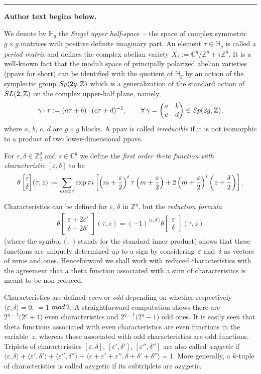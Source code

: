 \documentclass[11pt]{article}
\numberwithin{equation}{section}
\numberwithin{equation}{section}
\newcommand{\de}{\delta}
\newcommand{\ep}{\varepsilon}
\newcommand{\CC}{{\mathbb{C}}}
\newcommand{\HH}{{\mathbb{H}}}
\newcommand{\ZZ}{{\mathbb{Z}}}
\def\ZZ{{\mathbb Z}}
\def\t{\theta}
\def\tt#1#2{{\t\left[\begin{matrix}{#1}\\ {#2}\end{matrix}\right]}}
\begin{document}
\medskip\hrule\medskip\noindent\textbf{Author text begins below.}\par
\setcounter{section}{1}
We denote by $\HH_g$ the {\it Siegel upper half-space}~-- the
space of complex symmetric $g\times g$ matrices with positive definite
imaginary part. An element $\tau\in\HH_g$ is called a {\it period
matrix} and defines the complex abelian variety $X_\tau:=\CC^g/\ZZ^g+\tau
\ZZ^g$. It is a well-known fact that the moduli space of principally polarized abelian varieties (ppavs for short) can be identified with the quotient of $\HH_g$ by an action of the symplectic group ${\rm Sp}(2g, \ZZ)$ which is a generalization of the standard action of ${\rm SL}(2,\ZZ)$ on the complex upper-half plane, namely,
\[
\gamma \cdot \tau := (a \tau + b) \cdot (c \tau + d)^{-1},\qquad \forall\, \gamma = \begin{pmatrix} a & b \\ c & d \end{pmatrix} \in {\rm Sp}(2g,\ZZ),
\]
where $a$, $b$, $c$, $d$ are $g \times g$ blocks. A ppav is called {\it irreducible} if it is not isomorphic to a product of two lower-dimensional ppavs.

For $\ep,\de\in \ZZ_2^g$ and $z\in \CC^g$ we define the {\it first order theta function with characteristic $[\ep,\de]$} to be
\[
\tt\ep\de(\tau,z):=\sum\limits_{m\in\ZZ^g} \exp \pi {\rm i} \left[\left(
m+\frac{\ep}{2}\right)^t\tau \left(m+\frac{\ep}{2}\right)+2\left(m+\frac{\ep}{2}\right)^t\left(z+
\frac{\de}{2}\right)\right].
\]

Characteristics can be defined for $\ep$, $\de$ in $\ZZ^g$, but the {\it reduction formula}
\begin{gather*}%
\tt{\ep+2\ep'}{\de+2\de'} (\tau , z) = (-1)^{\langle \ep ,\de'\rangle} \tt\ep\de(\tau,z) \end{gather*}
(where the symbol $\langle \cdot , \cdot \rangle$ stands for the standard inner product) shows that these functions are uniquely determined up to a sign by considering~$\ep$ and~$\de$ as vectors of zeros and ones. Henceforward we shall work with reduced characteristics with the agreement that a theta function associated with a sum of characteristics is meant to be non-reduced.

Characteristics are defined {\it even} or {\it odd} depending on whether respectively $\langle \ep , \de\rangle =0,\, =1$ ${\rm mod}\, 2$. A straightforward computation shows there are $ 2^{g-1}\big( 2^{g}+1\big)$ even characteristics and $2^{g-1}\big( 2^{g}-1\big)$ odd ones. It is easily seen that theta functions associated with even characteristics are even functions in the variable~$z$, whereas those associated with odd characteristics are odd functions.
Triplets of characteristics $[\ep,\de]$, $[\ep',\de']$, $[\ep'',\de'']$ are also called {\it azygetic} if $\langle \ep , \de\rangle+\langle\ep' , \de'\rangle+\langle\ep'' , \de''\rangle+\langle\ep + \ep' + \ep'' , \de + \de' + \de''\rangle=1$. More generally, a $k$-tuple of characteristics is called azygetic if its subtriplets are azygetic.
\end{document}
